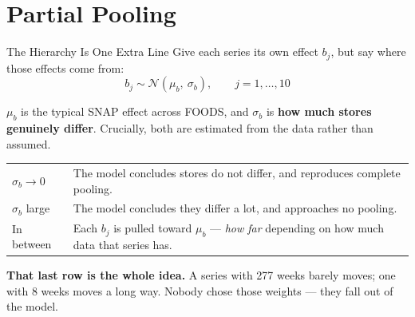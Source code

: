 \documentclass[aspectratio=169, 11pt]{beamer}
\begin{document}
\section{Partial Pooling}


\begin{frame}{The Hierarchy Is One Extra Line}
  Give each series its own effect $b_j$, but say where those effects come from:
  \[
    b_j \sim \mathcal{N}(\mu_b,\ \sigma_b), \qquad j = 1, \ldots, 10
  \]
  \vspace{-0.25cm}

  $\mu_b$ is the typical SNAP effect across FOODS, and $\sigma_b$ is \textbf{how much stores
  genuinely differ}. Crucially, both are estimated from the data rather than assumed.

  \begin{center}
    {\small
    \begin{tabular}{p{3.1cm}p{9.2cm}}
      \toprule
      $\sigma_b \rightarrow 0$ & The model concludes stores do not differ, and reproduces
      complete pooling. \\[3pt]
      $\sigma_b$ large & The model concludes they differ a lot, and approaches no pooling. \\[3pt]
      In between & Each $b_j$ is pulled toward $\mu_b$ --- \emph{how far} depending on how much
      data that series has. \\
      \bottomrule
    \end{tabular}
    }
  \end{center}

  \vspace{0.05cm}
  \textbf{That last row is the whole idea.} A series with 277 weeks barely moves; one with 8 weeks
  moves a long way. Nobody chose those weights --- they fall out of the model.
\end{frame}
\end{document}
